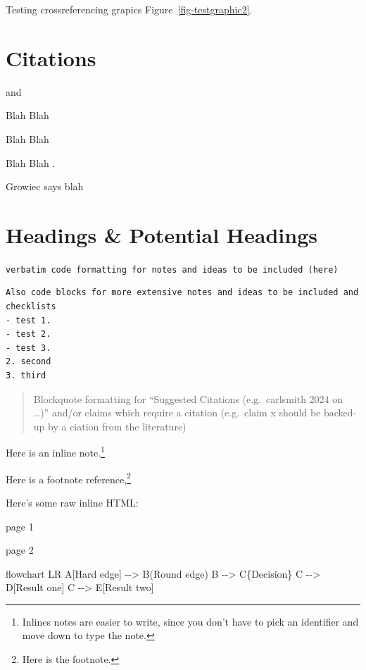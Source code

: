 \documentclass[
  11pt,
  letterpaper,
]{book}
\newenvironment{Shaded}{\begin{snugshade}}{\end{snugshade}}
\newcommand{\NormalTok}[1]{\textcolor[rgb]{0.00,0.23,0.31}{#1}}
\begin{document}
Testing crossreferencing grapics Figure~\ref{fig-testgraphic2}.

\section*{Citations}\label{sec-citations}


\textcite{soares2014}

\autocite{soares2014} and \autocite{knuth1984}

Blah Blah \autocites[see][33-35]{knuth1984}[also][chap.~1]{growiec2024}

Blah Blah \autocite[33-35, 38-39 and passim]{knuth1984}

Blah Blah \autocite{growiec2024,knuth1984}.

Growiec says blah \autocite*{growiec2024}

\section{Headings \& Potential Headings}\label{sec-heading}

\texttt{verbatim\ code\ formatting\ for\ notes\ and\ ideas\ to\ be\ included\ (here)}

\begin{verbatim}
Also code blocks for more extensive notes and ideas to be included and checklists
- test 1. 
- test 2. 
- test 3.
2. second
3. third
\end{verbatim}

\begin{quote}
Blockquote formatting for ``Suggested Citations (e.g.~carlsmith 2024 on
\ldots)'' and/or claims which require a citation (e.g.~claim x should be
backed-up by a ciation from the literature)
\end{quote}

Here is an inline note.\footnote{Inlines notes are easier to write,
  since you don't have to pick an identifier and move down to type the
  note.}

Here is a footnote reference,\footnote{Here is the footnote.}

\renewcommand*{\labelitemi}{\textgreater}

Here's some raw inline HTML:

page 1

\newpage{}

page 2

\begin{Shaded}
\begin{Highlighting}[]
\NormalTok{flowchart LR}
\NormalTok{  A[Hard edge] {-}{-}\textgreater{} B(Round edge)}
\NormalTok{  B {-}{-}\textgreater{} C\{Decision\}}
\NormalTok{  C {-}{-}\textgreater{} D[Result one]}
\NormalTok{  C {-}{-}\textgreater{} E[Result two]}
\end{Highlighting}
\end{Shaded}
\end{document}
